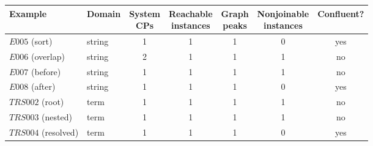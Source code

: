 \small
\setlength{\tabcolsep}{5pt}
\begin{tabular}{@{}llccccc@{}}
\toprule
Example & Domain & \shortstack{System\\CPs} & \shortstack{Reachable\\instances} & \shortstack{Graph\\peaks} & \shortstack{Nonjoinable\\instances} & Confluent? \\
\midrule
$E005$ (sort)          & string & 1 & 1 & 1 & 0 & yes \\
$E006$ (overlap)       & string & 2 & 1 & 1 & 1 & no \\
$E007$ (before)        & string & 1 & 1 & 1 & 1 & no \\
$E008$ (after)         & string & 1 & 1 & 1 & 0 & yes \\
$TRS002$ (root)        & term   & 1 & 1 & 1 & 1 & no \\
$TRS003$ (nested)      & term   & 1 & 1 & 1 & 1 & no \\
$TRS004$ (resolved)    & term   & 1 & 1 & 1 & 0 & yes \\
\bottomrule
\end{tabular}
